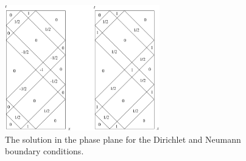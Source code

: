{\begin{Solution}
  \begin{figure}[h!]
    \begin{center}
      \includegraphics[width=0.6\textwidth]{pde/waves/phaseu0u40}
    \end{center}
    \caption{The solution in the phase plane for the Dirichlet and
      Neumann boundary conditions.}
    \label{phaseu0u40}
  \end{figure}
\end{Solution}











}
